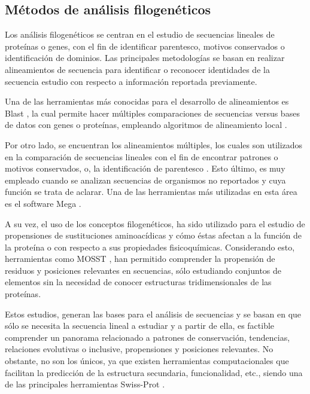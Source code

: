 \subsection{Métodos de análisis filogenéticos} 

Los análisis filogenéticos se centran en el estudio de secuencias lineales de proteínas o genes, con el fin de identificar parentesco, motivos conservados o identificación de dominios. Las principales metodologías se basan en realizar alineamientos de secuencia para identificar o reconocer identidades de la secuencia estudio con respecto a información reportada previamente. 

Una de las herramientas más conocidas para el desarrollo de alineamientos es Blast \cite{kent2002blat}, la cual permite hacer múltiples comparaciones de secuencias versus bases de datos con genes o proteínas, empleando algoritmos de alineamiento local \cite{altschul1990basic}. 

Por otro lado, se encuentran los alineamientos múltiples, los cuales son utilizados en la comparación de secuencias lineales con el fin de encontrar patrones o motivos conservados, o, la identificación de parentesco \cite{Thompson1997}. Esto último, es muy empleado cuando se analizan secuencias de organismos no reportados y cuya función se trata de aclarar. Una de las herramientas más utilizadas en esta área es el software Mega \cite{mst197}.

A su vez, el uso de los conceptos filogenéticos, ha sido utilizado para el estudio de propensiones de sustituciones aminoacídicas y cómo éstas afectan a la función de la proteína o con respecto a sus propiedades fisicoquímicas. Considerando esto, herramientas como MOSST \cite{Olivera-Nappa2011}, han permitido comprender la propensión de residuos y posiciones relevantes en secuencias, sólo estudiando conjuntos de elementos sin la necesidad de conocer estructuras tridimensionales de las proteínas.

Estos estudios, generan las bases para el análisis de secuencias y se basan en que sólo se necesita la secuencia lineal a estudiar y a partir de ella, es factible comprender un panorama relacionado a patrones de conservación, tendencias, relaciones evolutivas o inclusive, propensiones y posiciones relevantes. No obstante, no son los únicos, ya que existen herramientas computacionales que facilitan la predicción de la estructura secundaria, funcionalidad, etc., siendo una de las principales herramientas Swiss-Prot \cite{boeckmann2003swiss}.

